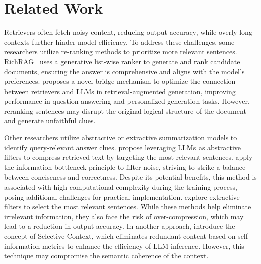 \section{Related Work}
Retrievers often fetch noisy content, reducing output accuracy, while overly long contexts further hinder model efficiency. To address these challenges, some researchers utilize re-ranking methods to prioritize more relevant sentences. 
RichRAG~\cite{wang-etal-2025-richrag} uses a generative list-wise ranker to generate and rank candidate documents, ensuring the answer is comprehensive and aligns with the model’s preferences. \citet{ke-etal-2024-bridging} proposes a novel bridge mechanism to optimize the connection between retrievers and LLMs in retrieval-augmented generation, improving performance in question-answering and personalized generation tasks.
However, reranking sentences may disrupt the original logical structure of the document and generate unfaithful clues.


Other researchers utilize abstractive or extractive summarization models to identify query-relevant answer clues. \citet{xu2024recomp} propose leveraging LLMs as abstractive filters to compress retrieved text by targeting the most relevant sentences. \citet{zhu2024information} apply the information bottleneck principle to filter noise, striving to strike a balance between conciseness and correctness. Despite its potential benefits, this method is associated with high computational complexity during the training process, posing additional challenges for practical implementation. \citet{xu2024recomp, wang2023learning} explore extractive filters to select the most relevant sentences. While these methods help eliminate irrelevant information, they also face the risk of over-compression, which may lead to a reduction in output accuracy.  In another approach, \citet{li2023compressing} introduce the concept of Selective Context, which eliminates redundant content based on self-information metrics to enhance the efficiency of LLM inference. However, this technique may compromise the semantic coherence of the context.